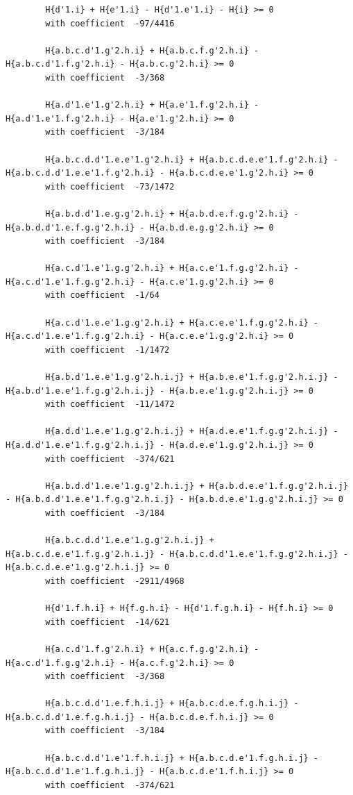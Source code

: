 \documentclass[11pt, a4paper]{kybernetika}
\begin{document}
\begin{verbatim}
		H{d'1.i} + H{e'1.i} - H{d'1.e'1.i} - H{i} >= 0
		with coefficient  -97/4416
		
		H{a.b.c.d'1.g'2.h.i} + H{a.b.c.f.g'2.h.i} - H{a.b.c.d'1.f.g'2.h.i} - H{a.b.c.g'2.h.i} >= 0
		with coefficient  -3/368
		
		H{a.d'1.e'1.g'2.h.i} + H{a.e'1.f.g'2.h.i} - H{a.d'1.e'1.f.g'2.h.i} - H{a.e'1.g'2.h.i} >= 0
		with coefficient  -3/184
		
		H{a.b.c.d.d'1.e.e'1.g'2.h.i} + H{a.b.c.d.e.e'1.f.g'2.h.i} - H{a.b.c.d.d'1.e.e'1.f.g'2.h.i} - H{a.b.c.d.e.e'1.g'2.h.i} >= 0
		with coefficient  -73/1472
		
		H{a.b.d.d'1.e.g.g'2.h.i} + H{a.b.d.e.f.g.g'2.h.i} - H{a.b.d.d'1.e.f.g.g'2.h.i} - H{a.b.d.e.g.g'2.h.i} >= 0
		with coefficient  -3/184
		
		H{a.c.d'1.e'1.g.g'2.h.i} + H{a.c.e'1.f.g.g'2.h.i} - H{a.c.d'1.e'1.f.g.g'2.h.i} - H{a.c.e'1.g.g'2.h.i} >= 0
		with coefficient  -1/64
		
		H{a.c.d'1.e.e'1.g.g'2.h.i} + H{a.c.e.e'1.f.g.g'2.h.i} - H{a.c.d'1.e.e'1.f.g.g'2.h.i} - H{a.c.e.e'1.g.g'2.h.i} >= 0
		with coefficient  -1/1472
		
		H{a.b.d'1.e.e'1.g.g'2.h.i.j} + H{a.b.e.e'1.f.g.g'2.h.i.j} - H{a.b.d'1.e.e'1.f.g.g'2.h.i.j} - H{a.b.e.e'1.g.g'2.h.i.j} >= 0
		with coefficient  -11/1472
		
		H{a.d.d'1.e.e'1.g.g'2.h.i.j} + H{a.d.e.e'1.f.g.g'2.h.i.j} - H{a.d.d'1.e.e'1.f.g.g'2.h.i.j} - H{a.d.e.e'1.g.g'2.h.i.j} >= 0
		with coefficient  -374/621
		
		H{a.b.d.d'1.e.e'1.g.g'2.h.i.j} + H{a.b.d.e.e'1.f.g.g'2.h.i.j} - H{a.b.d.d'1.e.e'1.f.g.g'2.h.i.j} - H{a.b.d.e.e'1.g.g'2.h.i.j} >= 0
		with coefficient  -3/184
		
		H{a.b.c.d.d'1.e.e'1.g.g'2.h.i.j} + H{a.b.c.d.e.e'1.f.g.g'2.h.i.j} - H{a.b.c.d.d'1.e.e'1.f.g.g'2.h.i.j} - H{a.b.c.d.e.e'1.g.g'2.h.i.j} >= 0
		with coefficient  -2911/4968
		
		H{d'1.f.h.i} + H{f.g.h.i} - H{d'1.f.g.h.i} - H{f.h.i} >= 0
		with coefficient  -14/621
		
		H{a.c.d'1.f.g'2.h.i} + H{a.c.f.g.g'2.h.i} - H{a.c.d'1.f.g.g'2.h.i} - H{a.c.f.g'2.h.i} >= 0
		with coefficient  -3/368
		
		H{a.b.c.d.d'1.e.f.h.i.j} + H{a.b.c.d.e.f.g.h.i.j} - H{a.b.c.d.d'1.e.f.g.h.i.j} - H{a.b.c.d.e.f.h.i.j} >= 0
		with coefficient  -3/184
		
		H{a.b.c.d.d'1.e'1.f.h.i.j} + H{a.b.c.d.e'1.f.g.h.i.j} - H{a.b.c.d.d'1.e'1.f.g.h.i.j} - H{a.b.c.d.e'1.f.h.i.j} >= 0
		with coefficient  -374/621
		

\end{verbatim}
\end{document}
